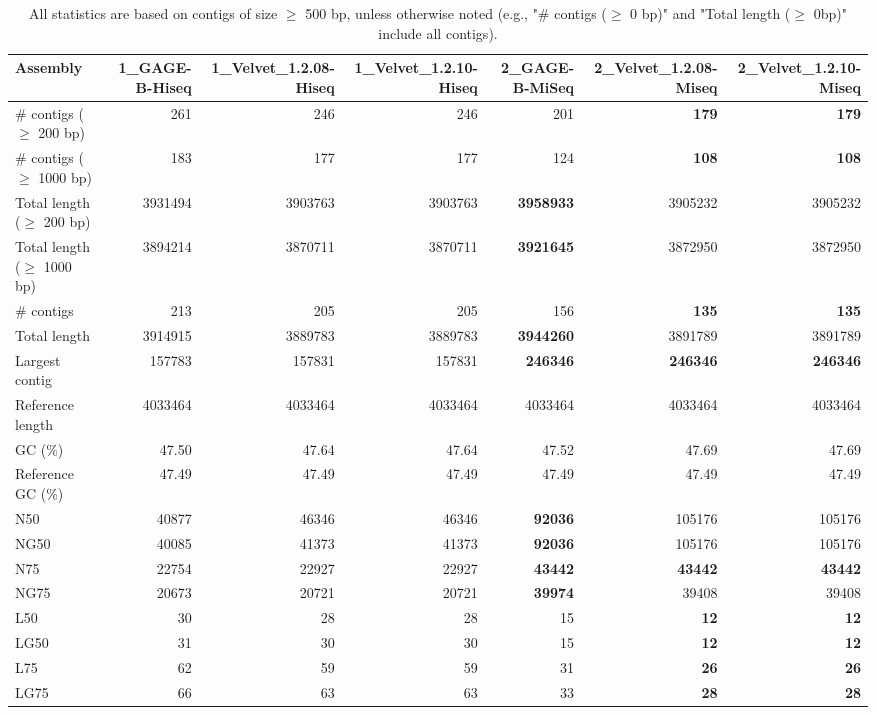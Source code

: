 \documentclass[12pt,a4paper]{article}
\begin{document}
\begin{table}[ht]
\begin{center}
\caption{All statistics are based on contigs of size $\geq$ 500 bp, unless otherwise noted (e.g., "\# contigs ($\geq$ 0 bp)" and "Total length ($\geq$ 0bp)" include all contigs).}
\begin{tabular}{|l*{6}{|r}|}
\hline
Assembly & 1\_GAGE-B-Hiseq & 1\_Velvet\_1.2.08-Hiseq & 1\_Velvet\_1.2.10-Hiseq & 2\_GAGE-B-MiSeq & 2\_Velvet\_1.2.08-Miseq & 2\_Velvet\_1.2.10-Miseq \\ \hline
\# contigs ($\geq$ 200 bp) & 261 & 246 & 246 & 201 & {\bf 179} & {\bf 179} \\ \hline
\# contigs ($\geq$ 1000 bp) & 183 & 177 & 177 & 124 & {\bf 108} & {\bf 108} \\ \hline
Total length ($\geq$ 200 bp) & 3931494 & 3903763 & 3903763 & {\bf 3958933} & 3905232 & 3905232 \\ \hline
Total length ($\geq$ 1000 bp) & 3894214 & 3870711 & 3870711 & {\bf 3921645} & 3872950 & 3872950 \\ \hline
\# contigs & 213 & 205 & 205 & 156 & {\bf 135} & {\bf 135} \\ \hline
Total length & 3914915 & 3889783 & 3889783 & {\bf 3944260} & 3891789 & 3891789 \\ \hline
Largest contig & 157783 & 157831 & 157831 & {\bf 246346} & {\bf 246346} & {\bf 246346} \\ \hline
Reference length & 4033464 & 4033464 & 4033464 & 4033464 & 4033464 & 4033464 \\ \hline
GC (\%) & 47.50 & 47.64 & 47.64 & 47.52 & 47.69 & 47.69 \\ \hline
Reference GC (\%) & 47.49 & 47.49 & 47.49 & 47.49 & 47.49 & 47.49 \\ \hline
N50 & 40877 & 46346 & 46346 & {\bf 92036} & 105176 & 105176 \\ \hline
NG50 & 40085 & 41373 & 41373 & {\bf 92036} & 105176 & 105176 \\ \hline
N75 & 22754 & 22927 & 22927 & {\bf 43442} & {\bf 43442} & {\bf 43442} \\ \hline
NG75 & 20673 & 20721 & 20721 & {\bf 39974} & 39408 & 39408 \\ \hline
L50 & 30 & 28 & 28 & 15 & {\bf 12} & {\bf 12} \\ \hline
LG50 & 31 & 30 & 30 & 15 & {\bf 12} & {\bf 12} \\ \hline
L75 & 62 & 59 & 59 & 31 & {\bf 26} & {\bf 26} \\ \hline
LG75 & 66 & 63 & 63 & 33 & {\bf 28} & {\bf 28} \\ \hline

\end{tabular}
\end{center}
\end{table}
\end{document}
